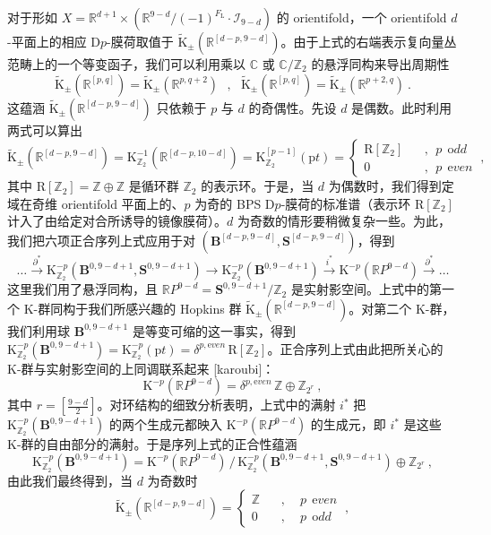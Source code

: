 \documentclass[11pt,a4paper]{ctexart}
\begin{document}
对于形如 \(X={\mathbb{R}}^{d+1}\times({\mathbb{R}}^{9-d}/{(-1)^{F_{\mathrm L}}}\cdot{\mathcal I}_{9-d})\) 的 orientifold，一个 orientifold \(d\)-平面上的相应 D\(p\)-膜荷取值于 \(\widetilde{{\mathrm K}}_{\pm}({\mathbb{R}}^[d-p,9-d])\)。由于上式的右端表示复向量丛范畴上的一个等变函子，我们可以利用乘以 \({\mathbb{C}}\) 或 \({\mathbb{C}}/{\mathbb{Z}}_2\) 的悬浮同构来导出周期性 \[\widetilde{{\mathrm K}}_{\pm}({\mathbb{R}}^[p,q])=\widetilde{{\mathrm K}}_{\pm}({\mathbb{R}}^{p,q+2})\ \ \ ,
\ \ \ \widetilde{{\mathrm K}}_{\pm}({\mathbb{R}}^[p,q])=\widetilde{{\mathrm K}}_{\pm}({\mathbb{R}}^{p+2,q})\ .\] 这蕴涵 \(\widetilde{{\mathrm K}}_{\pm}({\mathbb{R}}^[d-p,9-d])\) 只依赖于 \(p\) 与 \(d\) 的奇偶性。先设 \(d\) 是偶数。此时利用两式可以算出 \[\widetilde{{\mathrm K}}_{\pm}({\mathbb{R}}^[d-p,9-d])={\mathrm K}^{-1}_{{\mathbb{Z}}_2}({\mathbb{R}}^[d-p,10-d])
={\mathrm K}^[p-1]_{{\mathbb{Z}}_2}({\mathrm pt})=
\left\{\begin{array}{cl}{\mathrm R}[{\mathbb{Z}}_2]&~~~~,~~p~~{\mathrm odd}\\0&~~~~,
{}~~p~~{\mathrm even}\end{array}\right.\ ,\] 其中 \({\mathrm R}[{\mathbb{Z}}_2]={\mathbb{Z}}\oplus{\mathbb{Z}}\) 是循环群 \({\mathbb{Z}}_2\) 的表示环。于是，当 \(d\) 为偶数时，我们得到定域在奇维 orientifold 平面上的、\(p\) 为奇的 BPS D\(p\)-膜荷的标准谱（表示环 \({\mathrm R}[{\mathbb{Z}}_2]\) 计入了由给定对合所诱导的镜像膜荷）。\(d\) 为奇数的情形要稍微复杂一些。为此，我们把六项正合序列上式应用于对 \(({\mathbf B}^[d-p,9-d],{\mathbf S}^[d-p,9-d])\)，得到 \[\ldots\stackrel{\partial^*}{\longrightarrow}
{\mathrm K}^{-p}_{{\mathbb{Z}}_2}({\mathbf B}^{0,9-d+1},{\mathbf S}^{0,9-d+1})\longrightarrow
{\mathrm K}^{-p}_{{\mathbb{Z}}_2}({\mathbf B}^{0,9-d+1})\stackrel{i^*}{\longrightarrow}
{\mathrm K}^{-p}({\mathbb{R}} P^{9-d})\stackrel{\partial^*}{\longrightarrow}\ldots\] 这里我们用了悬浮同构，且 \({\mathbb{R}} P^{9-d}={\mathbf S}^{0,9-d+1}/{\mathbb{Z}}_2\) 是实射影空间。上式中的第一个 K-群同构于我们所感兴趣的 Hopkins 群 \(\widetilde{{\mathrm K}}_{\pm}({\mathbb{R}}^[d-p,9-d])\)。对第二个 K-群，我们利用球 \({\mathbf B}^{0,9-d+1}\) 是等变可缩的这一事实，得到 \({\mathrm K}^{-p}_{{\mathbb{Z}}_2}({\mathbf B}^{0,9-d+1})={\mathrm K}^{-p}_{{\mathbb{Z}}_2}({\mathrm pt})=\delta^{p,{\mathrm even}}\,{\mathrm R}[{\mathbb{Z}}_2]\)。正合序列上式由此把所关心的 K-群与实射影空间的上同调联系起来 [karoubi]： \[{\mathrm K}^{-p}({\mathbb{R}} P^{9-d})=\delta^{p,{\mathrm even}}\,{\mathbb{Z}}\oplus{\mathbb{Z}}_{2^r}\ ,\] 其中 \(r=\left[\frac{9-d}{2}\right]\)。对环结构的细致分析表明，上式中的满射 \(i^*\) 把 \({\mathrm K}^{-p}_{{\mathbb{Z}}_2}({\mathbf B}^{0,9-d+1})\) 的两个生成元都映入 \({\mathrm K}^{-p}({\mathbb{R}} P^{9-d})\) 的生成元，即 \(i^*\) 是这些 K-群的自由部分的满射。于是序列上式的正合性蕴涵 \[{\mathrm K}^{-p}_{{\mathbb{Z}}_2}({\mathbf B}^{0,9-d+1})={\mathrm K}^{-p}({\mathbb{R}} P^{9-d})\,/\,
{\mathrm K}^{-p}_{{\mathbb{Z}}_2}({\mathbf B}^{0,9-d+1},{\mathbf S}^{0,9-d+1})\oplus{\mathbb{Z}}_{2^r} \ ,\] 由此我们最终得到，当 \(d\) 为奇数时 \[\widetilde{{\mathrm K}}_{\pm}({\mathbb{R}}^[d-p,9-d])=
\left\{\begin{array}{cll}{\mathbb{Z}}~~~~&,&~~p~~{\mathrm even}\\0~~~~&,
&~~p~~{\mathrm odd}\end{array}\right.\ ,\]
\end{document}

